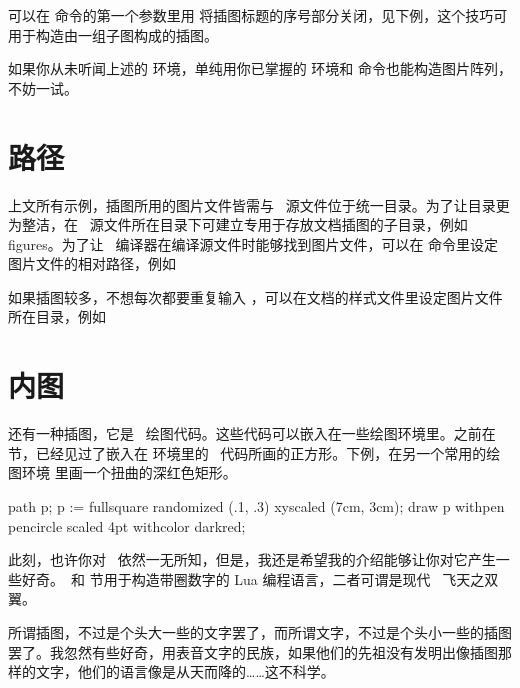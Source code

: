 可以在  命令的第一个参数里用  将插图标题的序号部分关闭，见下例，这个技巧可用于构造由一组子图构成的插图。

\startexample
{}
\stopexample
\simpleexample[option=TEX]{\null}
\getexample

如果你从未听闻上述的  环境，单纯用你已掌握的  环境和  命令也能构造图片阵列，不妨一试。

\section{路径}

上文所有示例，插图所用的图片文件皆需与 \CONTEXT\ 源文件位于统一目录。为了让目录更为整洁，在 \CONTEXT\ 源文件所在目录下可建立专用于存放文档插图的子目录，例如 figures。为了让 \CONTEXT\ 编译器在编译源文件时能够找到图片文件，可以在  命令里设定图片文件的相对路径，例如

\startTEX
{}
\stopTEX

\noindent 如果插图较多，不想每次都要重复输入 ，可以在文档的样式文件里设定图片文件所在目录，例如

\startTEX
\setupexternalfigures[directory=figures]
\stopTEX

\section{内图}

还有一种插图，它是 \METAPOST\ 绘图代码。这些代码可以嵌入在一些绘图环境里。之前在  节，已经见过了嵌入在  环境里的 \METAPOST\ 代码所画的正方形。下例，在另一个常用的绘图环境  里画一个扭曲的深红色矩形。

\startexample
{}
path p; p := fullsquare randomized (.1, .3) xyscaled (7cm, 3cm);
draw p withpen pencircle scaled 4pt withcolor darkred;
\stopuseMPgraphic
{}
\stopexample
\simpleexample[option=TEX]{\null}
\getexample

此刻，也许你对 \METAPOST\ 依然一无所知，但是，我还是希望我的介绍能够让你对它产生一些好奇。\METAPOST\ 和 \in[lua] 节用于构造带圈数字的 Lua 编程语言，二者可谓是现代 \CONTEXT\ 飞天之双翼。

\subject{结语}

所谓插图，不过是个头大一些的文字罢了，而所谓文字，不过是个头小一些的插图罢了。我忽然有些好奇，用表音文字的民族，如果他们的先祖没有发明出像插图那样的文字，他们的语言像是从天而降的……这不科学。
